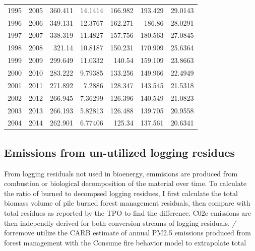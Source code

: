\documentclass[a4paper]{article}
\begin{document}
\begin{longtable}{rrrrrrr}
1995 & 2005 & 360.411 & 14.1414 & 166.982 & 193.429 & 29.0143\\
1996 & 2006 & 349.131 & 12.3767 & 162.271 & 186.86 & 28.0291\\
1997 & 2007 & 338.319 & 11.4827 & 157.756 & 180.563 & 27.0845\\
1998 & 2008 & 321.14 & 10.8187 & 150.231 & 170.909 & 25.6364\\
1999 & 2009 & 299.649 & 11.0332 & 140.54 & 159.109 & 23.8663\\
2000 & 2010 & 283.222 & 9.79385 & 133.256 & 149.966 & 22.4949\\
2001 & 2011 & 271.892 & 7.2886 & 128.347 & 143.545 & 21.5318\\
2002 & 2012 & 266.945 & 7.36299 & 126.396 & 140.549 & 21.0823\\
2003 & 2013 & 266.193 & 5.82813 & 126.488 & 139.705 & 20.9558\\
2004 & 2014 & 262.901 & 6.77406 & 125.34 & 137.561 & 20.6341\\
\end{longtable}


\subsection{Emissions from un-utilized logging residues}
\label{sec-3-2}

From logging residuals not used in bioenergy, emmisions are produced
from combustion or biological decomposition of the
material over time. To calculate the ratio of burned to decompsed
logging residues, I first calculate the total biomass volume of pile burned forest management residuals, then compare with total residues as reported by the TPO to find the difference. C02e emissions are then independly derived for both conversion streams of logging residuals. \emph{/} forremove  utilize the CARB estimate of annual PM2.5 emissions produced from
forest management with the Consume fire behavior model to extrapolate total 
\end{document}
